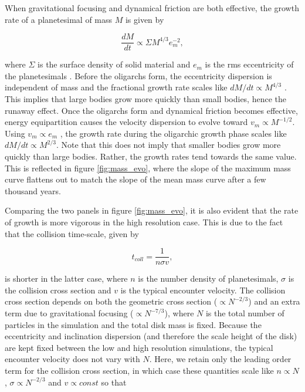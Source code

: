 When gravitational focusing and dynamical friction are both effective, the growth rate of a planetesimal of mass $M$ is given by

\begin{equation}\label{eq:growth_rate}
\frac{dM}{dt} \propto \Sigma M^{4/3} e_{m}^{-2},
\end{equation}

\noindent where $\Sigma$ is the surface density of solid material and $e_m$ is the rms eccentricity of the planetesimals 
\cite{kokubo95}. Before the oligarchs form, the eccentricity dispersion is independent of mass and the fractional growth rate 
scales like $dM/dt \propto M^{4/3}$ \cite{wetherill93}. This implies that large bodies grow more quickly than small bodies, hence 
the runaway effect. Once the oligarchs form and dynamical friction becomes effective, energy equipartition causes the velocity 
dispersion to evolve toward $v_m \propto M^{-1/2}$\cite{ida93}. Using $v_m \propto e_m$ \cite{lissauer93}, the growth rate 
during the oligarchic growth phase scales like  $dM/dt \propto M^{2/3}$. Note that this does not imply that smaller bodies grow 
more quickly than large bodies. Rather, the growth rates tend towards the same value. This is reflected in figure 
\ref{fig:mass_evo}, where the slope of the maximum mass curve flattens out to match the slope of the mean mass curve after a 
few thousand years.

Comparing the two panels in figure \ref{fig:mass_evo}, it is also evident that the rate of growth is more vigorous in the high 
resolution case. This is due to the fact that the collision time-scale, given by 

\begin{equation}\label{eq:coll_timescale}
t_{coll} = \frac{1}{n \sigma v},
\end{equation}

\noindent is shorter in the latter case, where $n$ is the number density of planetesimals, $\sigma$ is the collision cross section 
and $v$ is the typical encounter velocity. The collision cross section depends on both the geometric cross section ($\propto 
N^{-2/3}$) and an extra term due to gravitational focusing ($\propto N^{-7/3}$), where $N$ is the total number of particles in the 
simulation and the total disk mass is fixed. Because the eccentricity and inclination dispersion (and therefore the scale height of 
the disk) are kept fixed between the low and high resolution simulations, the typical encounter velocity does not vary with $N$. 
Here, we retain only the leading order term for the collision cross section, in which case these quantities scale like $n \propto N$, 
$\sigma \propto N^{-2/3}$ and $v \propto const$ so that

